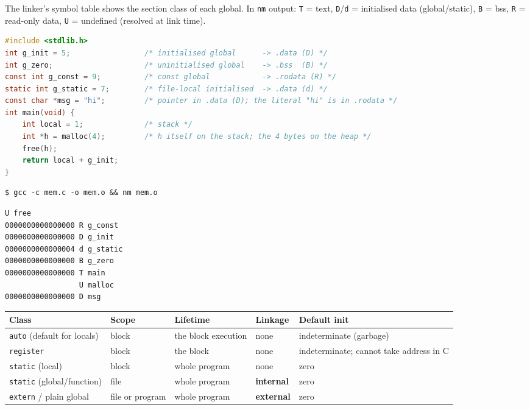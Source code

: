 \documentclass[10pt,a4paper,openany,oneside]{report}
\begin{document}
The linker's symbol table shows the section class of each global. In \texttt{nm} output: \texttt{T} = text, \texttt{D}/\texttt{d} = initialised data (global/static), \texttt{B} = bss, \texttt{R} = read-only data, \texttt{U} = undefined (resolved at link time).
\begin{lstlisting}[language={C}]
#include <stdlib.h>
int g_init = 5;                 /* initialised global      -> .data (D) */
int g_zero;                     /* uninitialised global    -> .bss  (B) */
const int g_const = 9;          /* const global            -> .rodata (R) */
static int g_static = 7;        /* file-local initialised  -> .data (d) */
const char *msg = "hi";         /* pointer in .data (D); the literal "hi" is in .rodata */
int main(void) {
    int local = 1;              /* stack */
    int *h = malloc(4);         /* h itself on the stack; the 4 bytes on the heap */
    free(h);
    return local + g_init;
}
\end{lstlisting}
\begin{lstlisting}[style=shcmd]
$ gcc -c mem.c -o mem.o && nm mem.o
\end{lstlisting}
\begin{lstlisting}[style=out]
                 U free
0000000000000000 R g_const
0000000000000000 D g_init
0000000000000004 d g_static
0000000000000000 B g_zero
0000000000000000 T main
                 U malloc
0000000000000000 D msg
\end{lstlisting}

\begin{center}\small
\begin{xltabular}{\textwidth}{@{}L{2.2cm}L{3.3cm}L{3.3cm}L{3.0cm}Y@{}}
\toprule
\textbf{Class} & \textbf{Scope} & \textbf{Lifetime} & \textbf{Linkage} & \textbf{Default init}\\
\midrule\endhead
\texttt{auto} (default for locals) & block & the block execution & none & indeterminate (garbage)\\
\texttt{register} & block & the block & none & indeterminate; cannot take address in C\\
\texttt{static} (local) & block & whole program & none & zero\\
\texttt{static} (global/function) & file & whole program & \textbf{internal} & zero\\
\texttt{extern} / plain global & file or program & whole program & \textbf{external} & zero\\
\bottomrule
\end{xltabular}
\end{center}
\end{document}

